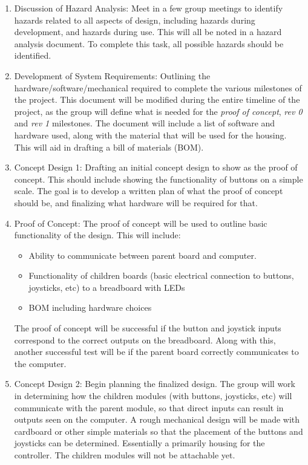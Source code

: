 \documentclass[a4]{article}
\begin{document}
\begin{enumerate}
	\item \textcolor{McMasterMaroon}{Discussion of Hazard Analysis}: Meet in a few group meetings to identify hazards related to all aspects of design, including hazards during development, and hazards during use. This will all be noted in a hazard analysis document. To complete this task, all possible hazards should be identified.
	\item \textcolor{McMasterMaroon}{Development of System Requirements}: Outlining the hardware/software/mechanical required to complete the various milestones of the project. This document will be modified during the entire timeline of the project, as the group will define what is needed for the \textit{proof of concept}, \textit{rev 0} and \textit{rev 1} milestones. The document will include a list of software and hardware used, along with the material that will be used for the housing. This will aid in drafting a bill of materials (BOM).
	\item \textcolor{McMasterMaroon}{Concept Design 1}: Drafting an initial concept design to show as the proof of concept. This should include showing the functionality of buttons on a simple scale. The goal is to develop a written plan of what the proof of concept should be, and finalizing what hardware will be required for that.
	\item \textcolor{McMasterMaroon}{Proof of Concept}: The proof of concept will be used to outline basic functionality of the design. This will include:
	      \begin{itemize}
		      \item Ability to communicate between parent board and computer.
		      \item Functionality of children boards (basic electrical connection to buttons, joysticks, etc) to a breadboard with LEDs
		      \item BOM including hardware choices
	      \end{itemize}
	      The proof of concept will be successful if the button and joystick inputs correspond to the correct outputs on the breadboard. Along with this, another successful test will be if the parent board correctly communicates to the computer.
	\item \textcolor{McMasterMaroon}{Concept Design 2}: Begin planning the finalized design. The group will work in determining how the children modules (with buttons, joysticks, etc) will communicate with the parent module, so that direct inputs can result in outputs seen on the computer. A rough mechanical design will be made with cardboard or other simple materials so that the placement of the buttons and joysticks can be determined. Essentially a primarily housing for the controller. The children modules will not be attachable yet.

\end{enumerate}
\end{document}
